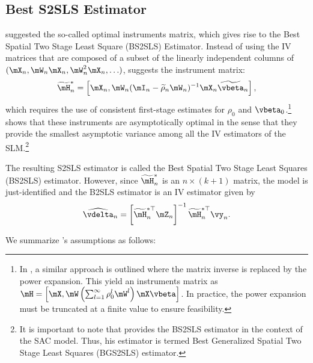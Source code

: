 \documentclass[english,12pt]{book}\usepackage[]{graphicx}\usepackage[]{xcolor}
\begin{document}
\subsection{Best S2SLS Estimator}\label{sec:BS2SLS}

\cite{lee2003best} suggested the so-called optimal instruments matrix, which gives rise to the Best Spatial Two Stage Least Square (BS2SLS) Estimator. Instead of using the IV matrices that are composed of a subset of the linearly independent columns of $(\mX_n, \mW_n\mX_n, \mW^2_n\mX_n, \ldots)$, \cite{lee2003best} suggests the instrument matrix:
\begin{equation*}
\widetilde{\mH}^{*}_n =\left[\mX_n, \mW_n(\mI_n - \widetilde{\rho}_n\mW_n)^{-1}\mX_n\widetilde{\vbeta}_n\right],
\end{equation*}
%
which requires the use of consistent first-stage estimates for $\rho_0$ and $\vbeta_0$.\footnote{In \cite{Keliejian2004}, a similar approach is outlined where the matrix inverse is replaced by the power expansion. This yield an instruments matrix as $\mH =\left[\mX, \mW\left(\sum_{l = 1}^{\infty}\rho_0^{l}\mW^l\right)\mX\vbeta\right]$. In practice, the power expansion must be truncated at a finite value to ensure feasibility.} \cite{lee2003best} shows that these instruments are asymptotically optimal in the sense that they provide the smallest asymptotic variance among all the IV estimators of the SLM.\footnote{It is important to note that \cite{lee2003best} provides the BS2SLS estimator in the context of the SAC model. Thus, his estimator is termed Best Generalized Spatial Two Stage Least Squares (BGS2SLS) estimator. }

The resulting S2SLS estimator is called the Best Spatial Two Stage Least Squares (BS2SLS) estimator. However, since $\widetilde{\mH}^{*}_n$ is an $n \times (k + 1)$ matrix, the model is just-identified and the B2SLS estimator is an IV estimator given by
\begin{equation}\label{eq:bs2sls-estimator}
\widehat{\vdelta}_n = \left[\widetilde{\mH}^{*\top}_n\mZ_n\right]^{-1}\widetilde{\mH}^{*\top}_n\vy_n.
\end{equation}

We summarize \cite{lee2003best}'s assumptions as follows:
\end{document}
